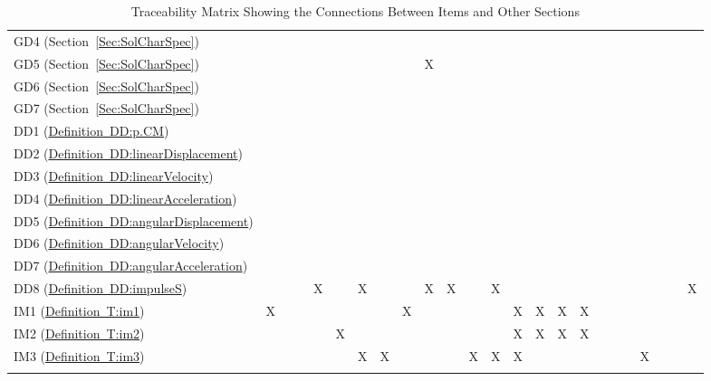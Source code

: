 \documentclass[12pt]{article}
\begin{document}
\begin{longtable}{l l l l l l l l l l l l l l l l l l l l l l l l}
\\
GD4 (Section~\ref{Sec:SolCharSpec}) &  &  &  &  &  &  &  &  &  &  &  &  &  &  &  &  &  &  &  &  &  &  & 
\\
GD5 (Section~\ref{Sec:SolCharSpec}) &  &  &  &  &  &  &  &  & X &  &  &  &  &  &  &  &  &  &  &  &  &  & 
\\
GD6 (Section~\ref{Sec:SolCharSpec}) &  &  &  &  &  &  &  &  &  &  &  &  &  &  &  &  &  &  &  &  &  &  & 
\\
GD7 (Section~\ref{Sec:SolCharSpec}) &  &  &  &  &  &  &  &  &  &  &  &  &  &  &  &  &  &  &  &  &  &  & 
\\
DD1 (\hyperref[DD:p.CM]{Definition~DD:p.CM}) &  &  &  &  &  &  &  &  &  &  &  &  &  &  &  &  &  &  &  &  &  &  & 
\\
DD2 (\hyperref[DD:linearDisplacement]{Definition~DD:linearDisplacement}) &  &  &  &  &  &  &  &  &  &  &  &  &  &  &  &  &  &  &  &  &  &  & 
\\
DD3 (\hyperref[DD:linearVelocity]{Definition~DD:linearVelocity}) &  &  &  &  &  &  &  &  &  &  &  &  &  &  &  &  &  &  &  &  &  &  & 
\\
DD4 (\hyperref[DD:linearAcceleration]{Definition~DD:linearAcceleration}) &  &  &  &  &  &  &  &  &  &  &  &  &  &  &  &  &  &  &  &  &  &  & 
\\
DD5 (\hyperref[DD:angularDisplacement]{Definition~DD:angularDisplacement}) &  &  &  &  &  &  &  &  &  &  &  &  &  &  &  &  &  &  &  &  &  &  & 
\\
DD6 (\hyperref[DD:angularVelocity]{Definition~DD:angularVelocity}) &  &  &  &  &  &  &  &  &  &  &  &  &  &  &  &  &  &  &  &  &  &  & 
\\
DD7 (\hyperref[DD:angularAcceleration]{Definition~DD:angularAcceleration}) &  &  &  &  &  &  &  &  &  &  &  &  &  &  &  &  &  &  &  &  &  &  & 
\\
DD8 (\hyperref[DD:impulseS]{Definition~DD:impulseS}) &  &  &  & X &  & X &  &  & X & X &  & X &  &  &  &  &  &  &  &  &  &  & X
\\
IM1 (\hyperref[T:im1]{Definition~T:im1}) & X &  &  &  &  &  &  & X &  &  &  &  & X & X & X & X &  &  &  &  &  &  & 
\\
IM2 (\hyperref[T:im2]{Definition~T:im2}) &  &  &  &  & X &  &  &  &  &  &  &  & X & X & X & X &  &  &  &  &  &  & 
\\
IM3 (\hyperref[T:im3]{Definition~T:im3}) &  &  &  &  &  & X & X &  &  &  & X & X & X &  &  &  &  &  &  & X &  &  & 
\\
\bottomrule
\caption{Traceability Matrix Showing the Connections Between Items and Other Sections}
\label{Table:TraceyItemsSecs}
\end{longtable}
\end{document}
